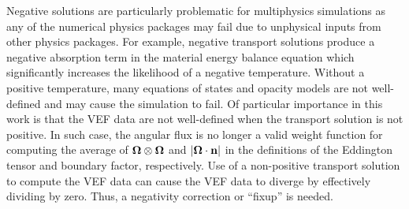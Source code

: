 \documentclass[../doc.tex]{subfiles}
\begin{document}
Negative solutions are particularly problematic for multiphysics simulations as any of the numerical physics packages may fail due to unphysical inputs from other physics packages. For example, negative transport solutions produce a negative absorption term in the material energy balance equation which significantly increases the likelihood of a negative temperature. Without a positive temperature, many equations of states and opacity models are not well-defined and may cause the simulation to fail. Of particular importance in this work is that the VEF data are not well-defined when the transport solution is not positive. In such case, the angular flux is no longer a valid weight function for computing the average of $\boldsymbol{\Omega}\otimes\boldsymbol{\Omega}$ and $|\boldsymbol{\Omega}\cdot\boldsymbol{\mathrm{n}}|$ in the definitions of the Eddington tensor and boundary factor, respectively. Use of a non-positive transport solution to compute the VEF data can cause the VEF data to diverge by effectively dividing by zero. 
Thus, a negativity correction or ``fixup'' is needed. 
\end{document}
